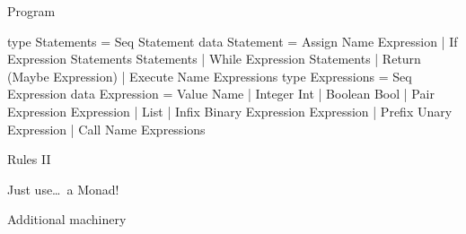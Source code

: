 \appendix

\begin{frame}[fragile]{Program}
  \begin{block}{}
    \begin{HASKELL}
      type Statements  = Seq Statement
      data Statement   = Assign  Name Expression
                       | If      Expression Statements Statements
                       | While   Expression Statements
                       | Return  (Maybe Expression)
                       | Execute Name Expressions
      type Expressions = Seq Expression
      data Expression  = Value    Name
                       | Integer  Int
                       | Boolean  Bool
                       | Pair     Expression Expression
                       | List
                       | Infix    Binary Expression Expression
                       | Prefix   Unary  Expression
                       | Call     Name   Expressions
    \end{HASKELL}
  \end{block}
\end{frame}


\begin{frame}[fragile]{Rules II}
  

  Just use\ldots\ a Monad!


  Additional machinery

  \begin{block}{}
  \end{block}

\end{frame}
    




